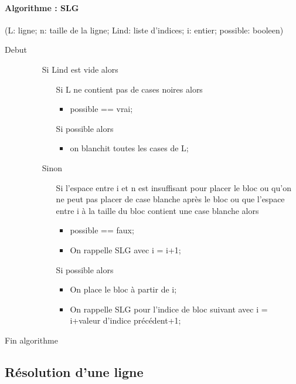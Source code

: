 \documentclass{article}
\begin{document}
\paragraph{Algorithme : SLG}(L: ligne; n: taille de la ligne; Lind: liste d'indices; i: entier; possible: booleen)
\begin{description}
\item[Debut]
\item[]
  \begin{itemize}
  \item[Si] Lind est vide alors 
    \begin{itemize}
    \item[Si] L ne contient pas de cases noires alors
      \begin{itemize}
      \item possible == vrai;
      \end{itemize}
    \item[Si] possible alors
      \begin{itemize}
      \item on blanchit toutes les cases de L;
      \end{itemize}
    \end{itemize}
  \item[Sinon]
    \begin{itemize}
    \item[Si] l'espace entre i et n est insuffisant pour placer le bloc ou qu'on ne peut pas placer de case blanche apr\`es le bloc ou que l'espace entre i à la taille du bloc contient une case blanche alors
      \begin{itemize}
      \item possible == faux;
      \item On rappelle SLG avec i = i+1;
      \end{itemize}
    \item[Si] possible alors 
      \begin{itemize}
    \item On place le bloc à partir de i;
    \item On rappelle SLG pour l'indice de bloc suivant avec i = i+valeur d'indice précédent+1;
      \end{itemize}
    \end{itemize}
  \end{itemize}
\item[Fin algorithme]
\end{description}
\subsection{Résolution d'une ligne}
\end{document}
